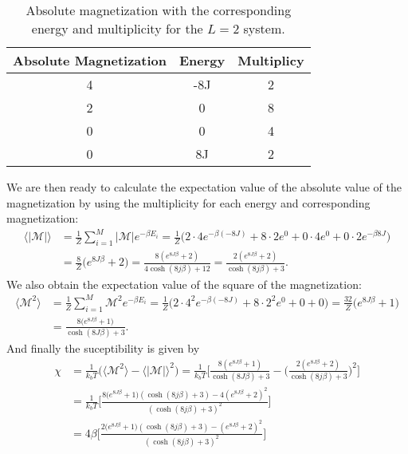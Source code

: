\documentclass[11pt,a4wide]{article}
\begin{document}
\begin{table}
\centering
\caption{Absolute magnetization with the corresponding energy and multiplicity for the $L=2$ system.}
\begin{tabular}{|c|c|c|}
\hline 
Absolute Magnetization & Energy &  Multiplicy\\ 
\hline 
4 & -8J & 2 \\ 
\hline 
2 & 0 & 8 \\ 
\hline 
0 & 0 & 4 \\ 
\hline 
0 & 8J & 2 \\ 
\hline 
\end{tabular} 
\label{tab: multiplic2}
\end{table}

We are then ready to calculate the expectation value of the absolute value of the magnetization by using the multiplicity for each energy and corresponding magnetization:
\begin{align}
\langle |\mathcal{M}| \rangle &= \frac{1}{Z}\sum_{i=1}^M |\mathcal{M}|  e^{-\beta E_i} = \frac{1}{Z} \bigg( 2\cdot 4e^{-\beta(-8J)} + 8\cdot 2e^0 + 0\cdot4e^0 + 0\cdot 2e^{-\beta 8J} \bigg)\nonumber \\
&= \frac{8}{Z}\big(e^{8J\beta} + 2\big) = \frac{8(e^{8J\beta} + 2)}{4\cosh(8j\beta) + 12} = \frac{2(e^{8J\beta}+ 2)}{\cosh(8j\beta) + 3}.
\label{eq: exp absM} 
\end{align}
We also obtain the expectation value of the square of the magnetization:
\begin{align*}
\langle \mathcal{M}^2 \rangle &= \frac{1}{Z}\sum_{i=1}^M \mathcal{M}^2 e^{-\beta E_i} = \frac{1}{Z}\big( 2\cdot 4^2 e^{-\beta (-8J)} + 8\cdot 2^2e^0 + 0 + 0 \big) = \frac{32}{Z}\big( e^{8J\beta} + 1 \big) \\
&= \frac{8\big(e^{8J\beta} + 1\big)}{\cosh(8J\beta) + 3}.
\end{align*}
And finally the suceptibility is given by
\begin{align*}
\chi &= \frac{1}{k_bT}\big( \langle \mathcal{M}^2 \rangle - \langle |\mathcal{M}| \rangle^2 \big) = \frac{1}{k_bT}\bigg[ \frac{8(e^{8J\beta} + 1)}{\cosh(8J\beta) + 3} - \bigg( \frac{2(e^{8J\beta}+ 2)}{\cosh(8j\beta) + 3} \bigg)^2 \bigg] \\
&= \frac{1}{k_bT}\bigg[ \frac{8(e^{8J\beta} + 1\big)(\cosh(8j\beta) + 3) - 4(e^{8J\beta}+ 2)^2}{(\cosh(8j\beta) + 3)^2} \bigg] \\
&= 4\beta \bigg[ \frac{2(e^{8J\beta} + 1\big)(\cosh(8j\beta) + 3) - (e^{8J\beta}+ 2)^2}{(\cosh(8j\beta) + 3)^2} \bigg] 
\end{align*}
\end{document}
